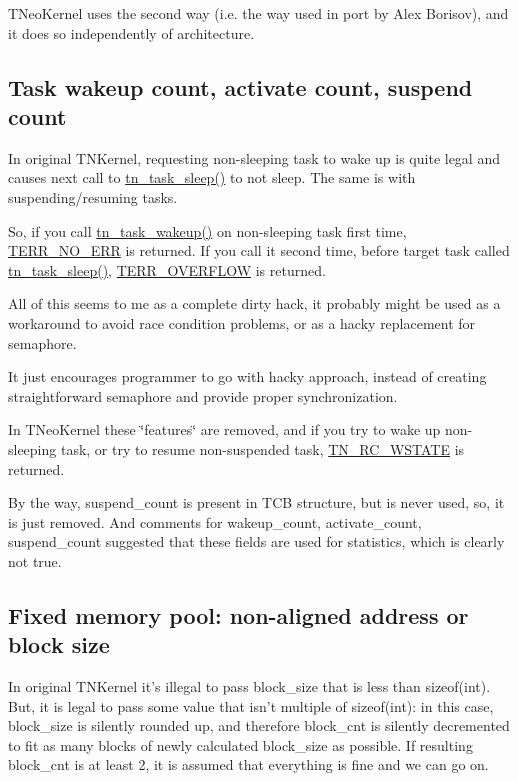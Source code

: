 T\+Neo\+Kernel uses the second way (i.\+e. the way used in port by Alex Borisov), and it does so independently of architecture.\hypertarget{tnkernel_diff_tnkernel_diff_wakeup_count}{}\subsection{Task wakeup count, activate count, suspend count}\label{tnkernel_diff_tnkernel_diff_wakeup_count}
In original T\+N\+Kernel, requesting non-\/sleeping task to wake up is quite legal and causes next call to {\ttfamily \hyperlink{tn__tasks_8h_ad3708ae3400f11b98747ad4a1cad88fa}{tn\+\_\+task\+\_\+sleep()}} to not sleep. The same is with suspending/resuming tasks.

So, if you call {\ttfamily \hyperlink{tn__tasks_8h_abb88bc8b1cec6b82e7b6e2e90d0e155a}{tn\+\_\+task\+\_\+wakeup()}} on non-\/sleeping task first time, {\ttfamily \hyperlink{tn__oldsymbols_8h_a71970f860643e62fad7ec03076bdc1d8}{T\+E\+R\+R\+\_\+\+N\+O\+\_\+\+E\+R\+R}} is returned. If you call it second time, before target task called {\ttfamily \hyperlink{tn__tasks_8h_ad3708ae3400f11b98747ad4a1cad88fa}{tn\+\_\+task\+\_\+sleep()}}, {\ttfamily \hyperlink{tn__oldsymbols_8h_abfe40d04917509ecd3a98c38878df5ff}{T\+E\+R\+R\+\_\+\+O\+V\+E\+R\+F\+L\+O\+W}} is returned.

All of this seems to me as a complete dirty hack, it probably might be used as a workaround to avoid race condition problems, or as a hacky replacement for semaphore.

It just encourages programmer to go with hacky approach, instead of creating straightforward semaphore and provide proper synchronization.

In T\+Neo\+Kernel these \char`\"{}features\char`\"{} are removed, and if you try to wake up non-\/sleeping task, or try to resume non-\/suspended task, {\ttfamily \hyperlink{tn__common_8h_aa43bd3da1ad4c1e61224b5f23b369876a7b6d93374f52ba4b2fc01b38b783aa4c}{T\+N\+\_\+\+R\+C\+\_\+\+W\+S\+T\+A\+T\+E}} is returned.

By the way, {\ttfamily suspend\+\_\+count} is present in {\ttfamily T\+C\+B} structure, but is never used, so, it is just removed. And comments for {\ttfamily wakeup\+\_\+count}, {\ttfamily activate\+\_\+count}, {\ttfamily suspend\+\_\+count} suggested that these fields are used for statistics, which is clearly not true.\hypertarget{tnkernel_diff_tnkernel_diff_fmem}{}\subsection{Fixed memory pool\+: non-\/aligned address or block size}\label{tnkernel_diff_tnkernel_diff_fmem}
In original T\+N\+Kernel it's illegal to pass {\ttfamily block\+\_\+size} that is less than {\ttfamily sizeof(int)}. But, it is legal to pass some value that isn't multiple of {\ttfamily sizeof(int)}\+: in this case, {\ttfamily block\+\_\+size} is silently rounded up, and therefore {\ttfamily block\+\_\+cnt} is silently decremented to fit as many blocks of newly calculated {\ttfamily block\+\_\+size} as possible. If resulting {\ttfamily block\+\_\+cnt} is at least 2, it is assumed that everything is fine and we can go on.

